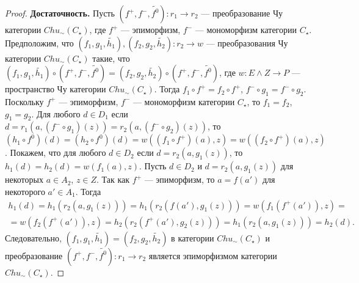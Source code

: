\documentclass[a4paper,12pt]{article}
\newcommand{\fo}{\widetilde{f^0}}
\begin{document}
\begin{proof}
    \textbf{Достаточность.} Пусть $(f^+,f^-,\fo): r_1 \to r_2$ --- преобразование Чу категории $Chu_\sim(C_\star)$, где $f^+$ --- эпиморфизм, $f^-$ --- мономорфизм категории $C_{\star}$. Предположим, что $(f_1,g_1,\widetilde{h_1}), (f_2,g_2,\widetilde{h_2}): r_2 \to w$ --- преобразования Чу категории $Chu_\sim(C_\star)$ такие, что $(f_1,g_1,\widetilde{h_1}) \circ (f^+,f^-,\fo) = (f_2,g_2,\widetilde{h_2}) \circ (f^+,f^-,\fo)$, где $w: E \wedge Z \to P$ --- пространство Чу категории $Chu_\sim(C_\star)$. Тогда $f_1 \circ f^+ = f_2 \circ f^+$, $f^- \circ g_1 = f^- \circ g_2$. Поскольку $f^+$ --- эпиморфизм, $f^-$ --- мономорфизм категории $C_\star$, то $f_1 = f_2$, $g_1 = g_2$. Для любого $d \in D_1$ если $d = r_1(a,(f^- \circ g_1)(z)) = r_2(a,(f^- \circ g_2)(z))$, то $(h_1 \circ f^0)(d) = (h_2 \circ f^0)(d) = w((f_1 \circ f^+)(a), z) = w((f_2 \circ f^+)(a), z)$. Покажем, что для любого $d \in D_2$ если $d = r_2(a,g_1(z))$, то $h_1(d) = h_2(d) = w(f_1(a),z)$. Пусть $d \in D_2$ и $d = r_2(a,g_1(z))$ для некоторых $a \in A_2$, $z \in Z$. Так как $f^+$ --- эпиморфизм, то $a = f(a')$ для некоторого $a' \in A_1$. Тогда 
    \begin{multline*}
        h_1(d) = h_1(r_2(a,g_1(z))) = h_1(r_2(f(a'),g_1(z))) = w(f_1(f^+(a')),z) =\\=
        w(f_2(f^+(a')),z) = h_2(r_2(f^+(a'),g_2(z))) = h_1(r_2(a,g_1(z))) = h_2(d).
    \end{multline*}
    Следовательно, $(f_1,g_1,\widetilde{h_1}) = (f_2,g_2,\widetilde{h_2})$ в категории $Chu_\sim(C_\star)$ и преобразование $(f^+,f^-,\fo): r_1 \to r_2$ является эпиморфизмом категории $Chu_\sim(C_\star)$.
\end{proof}
\end{document}
